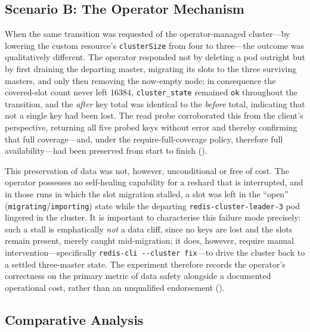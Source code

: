 \subsection{Scenario B: The Operator Mechanism}

When the same transition was requested of the operator-managed cluster---by lowering the
custom resource's \texttt{clusterSize} from four to three---the outcome was qualitatively
different. The operator responded not by deleting a pod outright but by first draining the
departing master, migrating its slots to the three surviving masters, and only then removing
the now-empty node; in consequence the covered-slot count never left \num{16384},
\texttt{cluster\_state} remained \texttt{ok} throughout the transition, and the \emph{after}
key total was identical to the \emph{before} total, indicating that not a single key had been
lost. The read probe corroborated this from the client's perspective, returning all five
probed keys without error and thereby confirming that full coverage---and, under the
require-full-coverage policy, therefore full availability---had been preserved from start to
finish (\cite{redis:scaling,opstree:redisoperator}).


This preservation of data was not, however, unconditional or free of cost. The operator
possesses no self-healing capability for a reshard that is interrupted, and in those runs in
which the slot migration stalled, a slot was left in the \enquote{open}
(\texttt{migrating}/\texttt{importing}) state while the departing
\texttt{redis-cluster-leader-3} pod lingered in the cluster. It is important to characterise
this failure mode precisely: such a stall is emphatically \emph{not} a data cliff, since no
keys are lost and the slots remain present, merely caught mid-migration; it does, however,
require manual intervention---specifically \texttt{redis-cli -{}-cluster fix}---to drive the
cluster back to a settled three-master state. The experiment therefore records the operator's
correctness on the primary metric of data safety alongside a documented operational cost,
rather than an unqualified endorsement (\cite{redis_admin}).

\subsection{Comparative Analysis}

